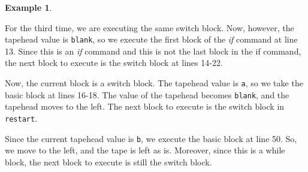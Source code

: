 \documentclass{article}
\theoremstyle{definition}
\newtheorem{example}[rules]{Example}
\begin{document}
\begin{example}
\begin{figure}[H]
    \end{figure}
    \noindent For the third time, we are executing the same switch block. Now, however, the tapehead value is \texttt{blank}, so we execute the first block of the \textit{if} command at line 13. Since this is an \textit{if} command and this is not the last block in the if command, the next block to execute is the switch block at lines 14-22.
    \begin{figure}[H]
        \centering
    \end{figure}
    \noindent Now, the current block is a switch block. The tapehead value is \texttt{a}, so we take the basic block at lines 16-18. The value of the tapehead becomes \texttt{blank}, and the tapehead moves to the left. The next block to execute is the switch block in \texttt{restart}.
    \begin{figure}[H]
        \centering
    \end{figure}
    \noindent Since the current tapehead value is \texttt{b}, we execute the basic block at line 50. So, we move to the left, and the tape is left as is. Moreover, since this is a while block, the next block to execute is still the switch block.
    \begin{figure}[H]
        \centering
\end{figure}
\end{example}
\end{document}
